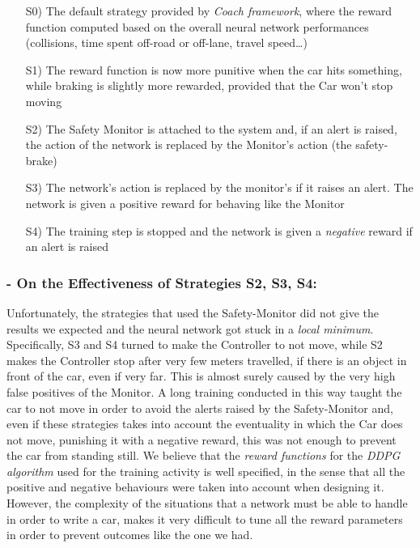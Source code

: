 \begin{itemize}
	\item[S0)] The default strategy provided by \textsl{Coach framework}, where the reward function computed based on the overall neural network performances (collisions, time spent off-road or off-lane, travel speed\dots)
	\item[S1)] The reward function is now more punitive when the car hits something, while braking is slightly more rewarded, provided that the Car won't stop moving
	\item[S2)] The Safety Monitor is attached to the system and, if an alert is raised, the action of the network is replaced by the Monitor's action (the safety-brake)
	\item[S3)] The network's action is replaced by the monitor's if it raises an alert. The network is given a positive reward for behaving like the Monitor
	\item[S4)] The training step is stopped and the network is given a \textsl{negative} reward if an alert is raised
\end{itemize}

\subsubsection{- On the Effectiveness of Strategies S2, S3, S4:}

Unfortunately, the strategies that used the Safety-Monitor did not give the results we expected and the neural network got stuck in a \textsl{local minimum}. Specifically, S3 and S4 turned to make the Controller to not move, while S2 makes the Controller stop after very few meters travelled, if there is an object in front of the car, even if very far. This is almost surely caused by the very high false positives of the Monitor. A long training conducted in this way taught the car to not move in order to avoid the alerts raised by the Safety-Monitor and, even if these strategies takes into account the eventuality in which the Car does not move, punishing it with a negative reward, this was not enough to prevent the car from standing still.
We believe that the \textsl{reward functions} for the \textsl{DDPG algorithm} used for the training activity is well specified, in the sense that all the positive and negative behaviours were taken into account when designing it. However, the complexity of the situations that a network must be able to handle in order to write a car, makes it very difficult to tune all the reward parameters in order to prevent outcomes like the one we had.

